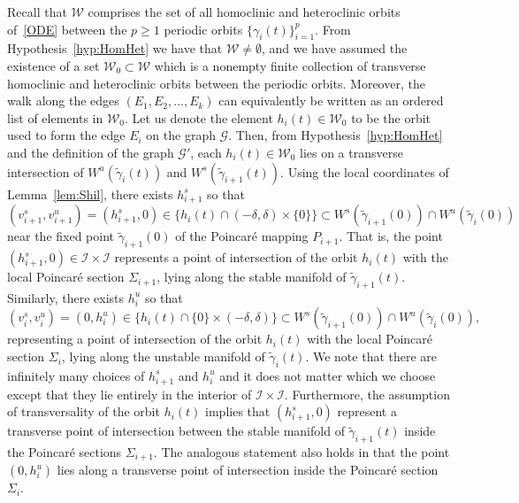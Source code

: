 \documentclass[11pt]{article}
\newcommand{\W}{\mathcal{W}}
\numberwithin{equation}{section}
\theoremstyle{plain}
\begin{document}
Recall that $\W$ comprises the set of all homoclinic and heteroclinic orbits of~\eqref{ODE} between the $p \geq 1$ periodic orbits $\{\gamma_i(t)\}_{i = 1}^p$. From Hypothesis~\ref{hyp:HomHet} we have that $\W \neq \emptyset$, and we have assumed the existence of a set $\W_0 \subset \W$ which is a nonempty finite collection of transverse homoclinic and heteroclinic orbits between the periodic orbits. Moreover, the walk along the edges $(E_1,E_2,\dots,E_k)$ can equivalently be written as an ordered list of elements in $\W_0$. Let us denote the element $h_i(t) \in \W_0$ to be the orbit used to form the edge $E_i$ on the graph $\mathcal{G}$. Then, from Hypothesis~\ref{hyp:HomHet} and the definition of the graph $\mathcal{G}'$, each $h_i(t) \in \W_0$ lies on a transverse intersection of $W^u(\tilde\gamma_i(t))$ and $W^s(\tilde\gamma_{i+1}(t))$. Using the local coordinates of Lemma~\ref{lem:Shil}, there exists $h^s_{i+1}$ so that 
\begin{equation}
	(v^s_{i+1},v^u_{i+1}) = (h^s_{i+1},0) \in \{h_i(t) \cap (-\delta,\delta)\times \{0\}\} \subset W^s(\tilde\gamma_{i+1}(0))\cap W^u(\tilde\gamma_i(0))
\end{equation} 
near the fixed point $\tilde\gamma_{i+1}(0)$ of the Poincar\'e mapping $P_{i+1}$. That is, the point $(h^s_{i+1},0)\in\mathcal{I}\times\mathcal{I}$ represents a point of intersection of the orbit $h_i(t)$ with the local Poincar\'e section $\Sigma_{i+1}$, lying along the stable manifold of $\tilde\gamma_{i+1}(t)$. Similarly, there exists $h_i^u$ so that 
\begin{equation}
	(v^s_i,v^u_i) = (0,h_i^u) \in \{h_i(t) \cap \{0\}\times(-\delta,\delta)\} \subset W^s(\tilde\gamma_{i+1}(0))\cap W^u(\tilde\gamma_i(0)),
\end{equation} 
representing a point of intersection of the orbit $h_i(t)$ with the local Poincar\'e section $\Sigma_i$, lying along the unstable manifold of $\tilde\gamma_i(t)$. We note that there are infinitely many choices of $h_{i+1}^s$ and $h_i^u$ and it does not matter which we choose except that they lie entirely in the interior of $\mathcal{I}\times\mathcal{I}$. Furthermore, the assumption of transversality of the orbit $h_i(t)$ implies that $(h^s_{i+1},0)$ represent a transverse point of intersection between the stable manifold of $\tilde\gamma_{i+1}(t)$ inside the Poincar\'e sections $\Sigma_{i+1}$. The analogous statement also holds in that the point $(0,h_i^u)$ lies along a transverse point of intersection inside the Poincar\'e section $\Sigma_i$.  
\end{document}
